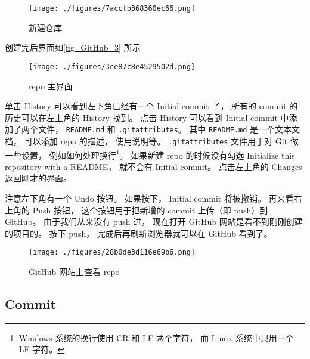 \begin{figure}[ht]
\centering
\texttt{[image: ./figures/7accfb368360ec66.png]}
\caption{新建仓库} \label{fig_GitHub_2}
\end{figure}

创建完后界面如\autoref{fig_GitHub_3} 所示
\begin{figure}[ht]
\centering
\texttt{[image: ./figures/3ce87c8e4529502d.png]}
\caption{repo 主界面} \label{fig_GitHub_3}
\end{figure}

单击 History 可以看到左下角已经有一个 Initial commit 了， 所有的 commit 的历史可以在左上角的 History 找到。 点击 History 可以看到 Initial commit 中添加了两个文件， \verb|README.md| 和 \verb|.gitattributes|。 其中 \verb|README.md| 是一个文本文档， 可以添加 repo 的描述， 使用说明等。 \verb|.gitattributes| 文件用于对 Git 做一些设置， 例如如何处理换行\footnote{Windows 系统的换行使用 CR 和 LF 两个字符， 而 Linux 系统中只用一个 LF 字符。}。 如果新建 repo 的时候没有勾选 Initialize this repository with a README， 就不会有 Initial commit。 点击左上角的 Changes 返回刚才的界面。

注意左下角有一个 Undo 按钮。 如果按下， Initial commit 将被撤销。 再来看右上角的 Push 按钮， 这个按钮用于把新增的 commit 上传（即 push）到 GitHub。 由于我们从来没有 push 过， 现在打开 GitHub 网站是看不到刚刚创建的项目的。 按下 push， 完成后再刷新浏览器就可以在 GitHub 看到了。
\begin{figure}[ht]
\centering
\texttt{[image: ./figures/28b0de3d116e69b6.png]}
\caption{GitHub 网站上查看 repo} \label{fig_GitHub_5}
\end{figure}

\subsection{Commit}
